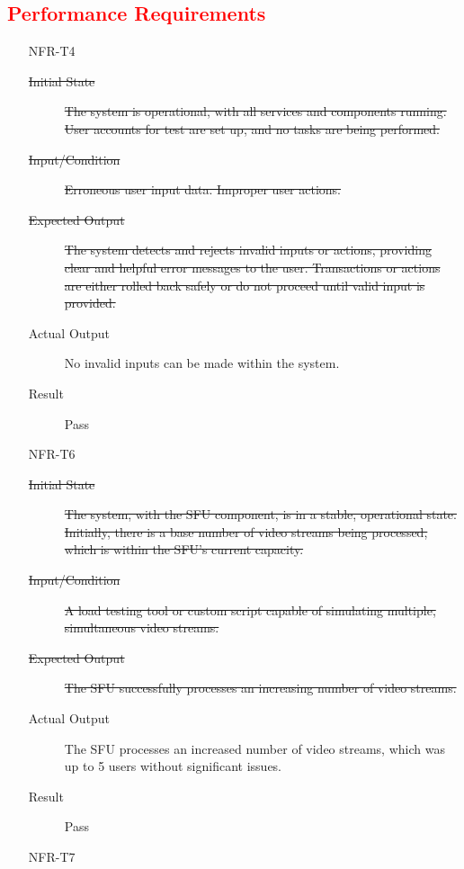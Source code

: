 \documentclass[12pt, titlepage]{article}
\newcommand{\rt}[1]{\textcolor{red}{#1}}
\begin{document}
  \rt{\subsection{Performance Requirements}}
  \begin{enumerate}
    \item[NFR-T4] \label{NFRT4}
      \begin{description}
      \item[\sout{Initial State}] \sout{The system is operational, with all
          services and components running. User accounts for test are set up,
          and no tasks are being performed.}
      \item[\sout{Input/Condition}] \sout{Erroneous user input data. Improper user
          actions.}
      \item[\sout{Expected Output}] \sout{The system detects and rejects invalid
          inputs or actions, providing clear and helpful error messages to the
          user. Transactions or actions are either rolled back safely or do not
          proceed until valid input is provided.}
      \item[Actual Output] No invalid inputs can be made within the system.
      \item[Result] Pass
      \end{description}
    \item[NFR-T6] \label{NFRT6}
      \begin{description}
      \item[\sout{Initial State}] \sout{The system, with the SFU component, is in a
          stable, operational state. Initially, there is a base number of video
          streams being processed, which is within the SFU's current capacity.}
      \item[\sout{Input/Condition}] \sout{A load testing tool or custom script
          capable of simulating multiple, simultaneous video streams.}
      \item[\sout{Expected Output}] \sout{The SFU successfully processes an
          increasing number of video streams.}
      \item[Actual Output] The SFU processes an increased number of video streams,
        which was up to 5 users without significant issues.
      \item[Result] Pass
      \end{description}
    \item[NFR-T7] \label{NFRT7}
      \begin{description}

\end{description}
\end{enumerate}
\end{document}
